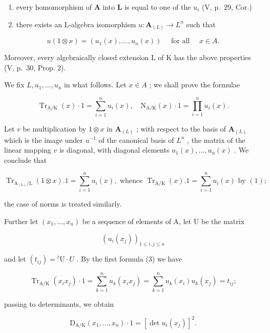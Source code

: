 \begin{enumerate}
\def\labelenumi{\alph{enumi})}
\item
  every homomorphism of \(\mathbf{A}\) into \(\mathbf{L}\) is equal to one of the \(u_{i}\) (V, p.~29, Cor.)
\item
  there exists an L-algebra isomorphism \(u: \mathbf{A}_{(L)} \to L^n\) such that
\end{enumerate}

\[
u (1 \otimes x) = \left(u _ {1} (x), \dots , u _ {n} (x)\right) \quad \text { for   all } \quad x \in A.
\]

Moreover, every algebraically closed extension L of K has the above properties (V, p.~30, Prop. 2).

We fix \(L, u_1, \ldots, u_n\) in what follows. Let \(x \in A\) ; we shall prove the formulae

\[
\operatorname{Tr} _ {\mathrm{A} / \mathrm{K}} (x) \cdot 1 = \sum_ {i = 1} ^ {n} u _ {i} (x), \quad \mathrm{N} _ {\mathrm{A} / \mathrm{K}} (x) \cdot 1 = \prod_ {i = 1} ^ {n} u _ {i} (x).\tag{3}
\]

Let \(v\) be multiplication by \(1 \otimes x\) in \(\mathbf{A}_{(L)}\) ; with respect to the basis of \(\mathbf{A}_{(L)}\) which is the image under \(u^{-1}\) of the canonical basis of \(L^n\) , the matrix of the linear mapping \(v\) is diagonal, with diagonal elements \(u_1(x), \ldots, u_n(x)\) . We conclude that

\[
\operatorname{Tr} _ {\mathrm{A} _ {(\mathrm{L})} / \mathrm{L}} (1 \otimes x). 1 = \sum_ {i = 1} ^ {n} u _ {i} (x), \text { whence } \operatorname{Tr} _ {\mathrm{A} / \mathrm{K}} (x). 1 = \sum_ {i = 1} ^ {n} u _ {i} (x) \text { by } (1);
\]

the case of norms is treated similarly.

Further let \((x_{1},\ldots ,x_{n})\) be a sequence of elements of A, let U be the matrix

\[
\left(u _ {i} \left(x _ {j}\right)\right) _ {1 \leqslant i, j \leqslant n}
\]

and let \((t_{ij}) = {}^t\mathrm{U} \cdot U\) . By the first formula (3) we have

\[
\operatorname{Tr} _ {\mathrm{A} / \mathrm{K}} \left(x _ {i} x _ {j}\right) \cdot 1 = \sum_ {k = 1} ^ {n} u _ {k} \left(x _ {i} x _ {j}\right) = \sum_ {k = 1} ^ {n} u _ {k} \left(x _ {i}\right) u _ {k} \left(x _ {j}\right) = t _ {i j};
\]

passing to determinants, we obtain

\[
\mathrm{D} _ {\mathrm{A} / \mathrm{K}} (x _ {1}, \dots , x _ {n}) \cdot 1 = [ \det u _ {i} (x _ {j}) ] ^ {2}.\tag{4}
\]

